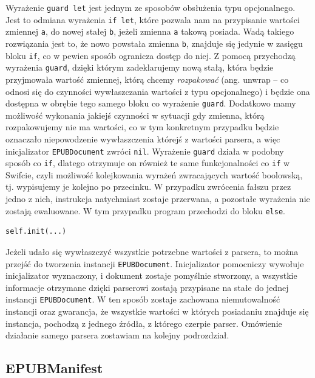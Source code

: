 Wyrażenie \texttt{guard let} jest jednym ze sposobów obsłużenia typu opcjonalnego. Jest to odmiana wyrażenia \texttt{if let}, które pozwala nam na przypisanie wartości zmiennej \texttt{a}, do nowej stałej \texttt{b}, jeżeli zmienna \texttt{a} takową posiada. Wadą takiego rozwiązania jest to, że nowo powstała zmienna \texttt{b}, znajduje się jedynie w zasięgu bloku \texttt{if}, co w pewien sposób ogranicza dostęp do niej. Z pomocą przychodzą wyrażenia \texttt{guard}, dzięki którym zadeklarujemy nową stałą, która będzie przyjmowała wartość zmiennej, którą chcemy \textit{rozpakować} (ang. unwrap -- co odnosi się do czynności wywłaszczania wartości z typu opcjonalnego) i będzie ona dostępna w obrębie tego samego bloku co wyrażenie \texttt{guard}. Dodatkowo mamy możliwość wykonania jakiejś czynności w sytuacji gdy zmienna, którą rozpakowujemy nie ma wartości, co w tym konkretnym przypadku będzie oznaczało niepowodzenie wywłaszczenia którejś z wartości parsera, a więc inicjalizator \texttt{EPUBDocument} zwróci \texttt{nil}. Wyrażenie \texttt{guard} działa w podobny sposób co \texttt{if}, dlatego otrzymuje on również te same funkcjonalności co \texttt{if} w Swifcie, czyli możliwość kolejkowania wyrażeń zwracających wartość boolowską, tj. wypisujemy je kolejno po przecinku. W przypadku zwrócenia fałszu przez jedno z nich, instrukcja natychmiast zostaje przerwana, a pozostałe wyrażenia nie zostają ewaluowane. W tym przypadku program przechodzi do bloku \texttt{else}.

\begin{lstlisting}[language=swift-reference,label=dasnfdngr,caption=adssf]
self.init(...)
\end{lstlisting}

Jeżeli udało się wywłaszczyć wszystkie potrzebne wartości z parsera, to można przejść do tworzenia instancji \texttt{EPUBDocument}. Inicjalizator pomocniczy wywołuje inicjalizator wyznaczony, i dokument zostaje pomyślnie stworzony, a wszystkie informacje otrzymane dzięki parserowi zostają przypisane na stałe do jednej instancji \texttt{EPUBDocument}. W ten sposób zostaje zachowana niemutowalność instancji oraz gwarancja, że wszystkie wartości w których posiadaniu znajduje się instancja, pochodzą z jednego źródła, z którego czerpie parser. Omówienie działanie samego parsera zostawiam na kolejny podrozdział.

\subsection{EPUBManifest}

